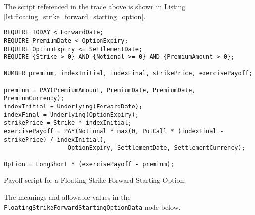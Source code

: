 The script referenced in the trade above is shown in Listing \ref{lst:floating_strike_forward_starting_option}.
 
\begin{listing}[hbt] 
\begin{verbatim} 
REQUIRE TODAY < ForwardDate;
REQUIRE PremiumDate < OptionExpiry;
REQUIRE OptionExpiry <= SettlementDate;
REQUIRE {Strike > 0} AND {Notional >= 0} AND {PremiumAmount > 0};

NUMBER premium, indexInitial, indexFinal, strikePrice, exercisePayoff;

premium = PAY(PremiumAmount, PremiumDate, PremiumDate, PremiumCurrency);
indexInitial = Underlying(ForwardDate);
indexFinal = Underlying(OptionExpiry);
strikePrice = Strike * indexInitial;
exercisePayoff = PAY(Notional * max(0, PutCall * (indexFinal - strikePrice) / indexInitial),
                  OptionExpiry, SettlementDate, SettlementCurrency);

Option = LongShort * (exercisePayoff - premium);
\end{verbatim} 
\caption{Payoff script for a Floating Strike Forward Starting Option.} 
\label{lst:floating_strike_forward_starting_option} 
\end{listing} 
 
The meanings and allowable values in the \lstinline!FloatingStrikeForwardStartingOptionData! node below.
 
